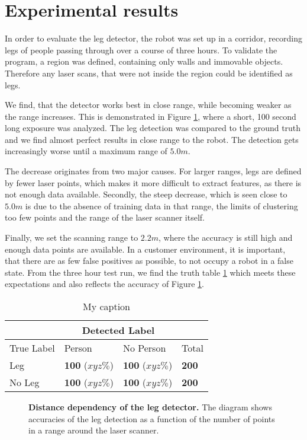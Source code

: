 \section{Experimental results}

In order to evaluate the leg detector, the robot was set up in a corridor, recording legs of people passing through over a course of three hours. To validate the program, a region was defined, containing only walls and immovable objects. Therefore any laser scans, that were not inside the region could be identified as legs.

We find, that the detector works best in close range, while becoming weaker as the range increases. This is demonstrated in Figure \ref{fig:radius_detection}, where a short, 100 second long exposure was analyzed. The leg detection was compared to the ground truth and we find almost perfect results in close range to the robot. The detection gets increasingly worse until a maximum range of $5.0 m$.

The decrease originates from two major causes. For larger ranges, legs are defined by fewer laser points, which makes it more difficult to extract features, as there is not enough data available. Secondly, the steep decrease, which is seen close to $5.0 m$ is due to the absence of training data in that range, the limits of clustering too few points and the range of the laser scanner itself.

Finally, we set the scanning range to $2.2 m$, where the accuracy is still high and enough data points are available. In a customer environment, it is important, that there are as few false positives as possible, to not occupy a robot in a false state. From the three hour test run, we find the truth table \ref{tab:truth} which meets these expectations and also reflects the accuracy of Figure \ref{fig:radius_detection}.

\begin{table}[]
	\label{tab:truth}
	\centering
	\caption{My caption}
	\begin{tabular}{|l|l|l|l|}
	\hline
	 & \multicolumn{2}{c}{Detected Label} &  \\ \hline
	 True Label & Person & No Person & Total \\ \hline
	 Leg & \textbf{100} ($xyz \%$) & \textbf{100} ($xyz \%$) & \textbf{200} \\
	 No Leg & \textbf{100} ($xyz \%$) & \textbf{100} ($xyz \%$) & \textbf{200} \\ \hline
	\end{tabular}
\end{table}

\begin{figure}
	\label{fig:radius_detection}
		\normalsize
		\begin{center}
			
		\end{center}
		\caption{\textbf{Distance dependency of the leg detector.} The diagram shows accuracies of the leg detection as a function of the number of points in a range around the laser scanner.}
\end{figure}